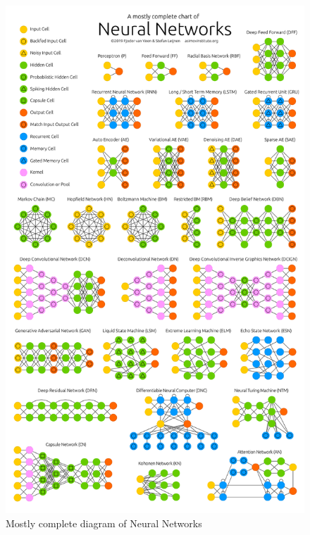 \documentclass[11pt]{article}
\begin{document}
    \begin{figure}[H]
        \centering
        \includegraphics[scale=0.04]{NeuralNetworks-Full.png}
        \caption{Mostly complete diagram of Neural Networks \cite{TheInstitute}}
        \label{fig:NN-Full}
    \end{figure}
    
\pagebreak

\printbibliography
\end{document}
